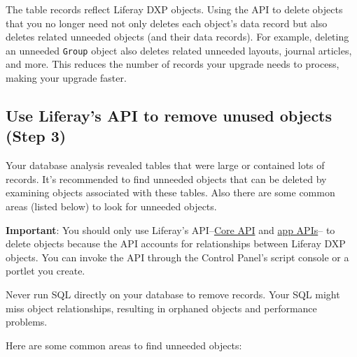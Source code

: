 The table records reflect Liferay DXP objects. Using the API to delete
objects that you no longer need not only deletes each object's data
record but also deletes related unneeded objects (and their data
records). For example, deleting an unneeded \texttt{Group} object also
deletes related unneeded layouts, journal articles, and more. This
reduces the number of records your upgrade needs to process, making your
upgrade faster.

\subsection{Use Liferay's API to remove unused objects (Step
3)}\label{use-liferays-api-to-remove-unused-objects-step-3}

Your database analysis revealed tables that were large or contained lots
of records. It's recommended to find unneeded objects that can be
deleted by examining objects associated with these tables. Also there
are some common areas (listed below) to look for unneeded objects.

\noindent\hrulefill

\textbf{Important}: You should only use Liferay's
API--\href{@platform-ref@/7.0-latest/javadocs/}{Core API} and
\href{@app-ref@}{app APIs}-- to delete objects because the API accounts
for relationships between Liferay DXP objects. You can invoke the API
through the Control Panel's script console or a portlet you create.

Never run SQL directly on your database to remove records. Your SQL
might miss object relationships, resulting in orphaned objects and
performance problems.

\noindent\hrulefill

Here are some common areas to find unneeded objects:

